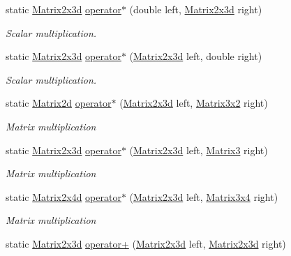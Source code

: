 \begin{DoxyCompactItemize}
static \hyperlink{struct_open_t_k_1_1_matrix2x3d}{Matrix2x3d} \hyperlink{struct_open_t_k_1_1_matrix2x3d_ab7e3f331001f13dfd53b78c8218ec2ee}{operator$\ast$} (double left, \hyperlink{struct_open_t_k_1_1_matrix2x3d}{Matrix2x3d} right)
\begin{DoxyCompactList}\small\item\em Scalar multiplication. \end{DoxyCompactList}\item 
static \hyperlink{struct_open_t_k_1_1_matrix2x3d}{Matrix2x3d} \hyperlink{struct_open_t_k_1_1_matrix2x3d_a433fb95eaa91c89334a6636e0415a7aa}{operator$\ast$} (\hyperlink{struct_open_t_k_1_1_matrix2x3d}{Matrix2x3d} left, double right)
\begin{DoxyCompactList}\small\item\em Scalar multiplication. \end{DoxyCompactList}\item 
static \hyperlink{struct_open_t_k_1_1_matrix2d}{Matrix2d} \hyperlink{struct_open_t_k_1_1_matrix2x3d_ae80a60064a13ba027d2ccbc3ae73cdc9}{operator$\ast$} (\hyperlink{struct_open_t_k_1_1_matrix2x3d}{Matrix2x3d} left, \hyperlink{struct_open_t_k_1_1_matrix3x2}{Matrix3x2} right)
\begin{DoxyCompactList}\small\item\em Matrix multiplication \end{DoxyCompactList}\item 
static \hyperlink{struct_open_t_k_1_1_matrix2x3d}{Matrix2x3d} \hyperlink{struct_open_t_k_1_1_matrix2x3d_a4337ee0f7aecd8e19407ca701e20fd01}{operator$\ast$} (\hyperlink{struct_open_t_k_1_1_matrix2x3d}{Matrix2x3d} left, \hyperlink{struct_open_t_k_1_1_matrix3}{Matrix3} right)
\begin{DoxyCompactList}\small\item\em Matrix multiplication \end{DoxyCompactList}\item 
static \hyperlink{struct_open_t_k_1_1_matrix2x4d}{Matrix2x4d} \hyperlink{struct_open_t_k_1_1_matrix2x3d_abcbe1727c54122fe3ae65751b0b3516b}{operator$\ast$} (\hyperlink{struct_open_t_k_1_1_matrix2x3d}{Matrix2x3d} left, \hyperlink{struct_open_t_k_1_1_matrix3x4}{Matrix3x4} right)
\begin{DoxyCompactList}\small\item\em Matrix multiplication \end{DoxyCompactList}\item 
static \hyperlink{struct_open_t_k_1_1_matrix2x3d}{Matrix2x3d} \hyperlink{struct_open_t_k_1_1_matrix2x3d_a0eb36b93624369885c84375a511a20f0}{operator+} (\hyperlink{struct_open_t_k_1_1_matrix2x3d}{Matrix2x3d} left, \hyperlink{struct_open_t_k_1_1_matrix2x3d}{Matrix2x3d} right)

\end{DoxyCompactItemize}
